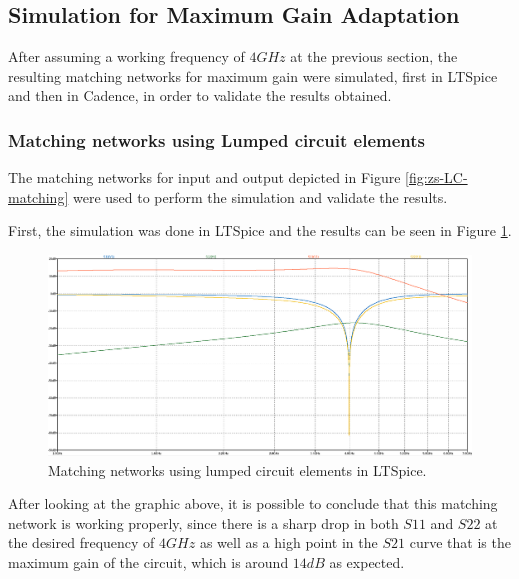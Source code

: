 \subsection{Simulation for Maximum Gain Adaptation}

After assuming a working frequency of $4 GHz$ at the previous section, the resulting matching networks for maximum gain were simulated, first in LTSpice and then in Cadence, in order to validate the results obtained.

\subsubsection{Matching networks using Lumped circuit elements}

The matching networks for input and output depicted in Figure \ref{fig:zs-LC-matching} were used to perform the simulation and validate the results.

First, the simulation was done in LTSpice and the results can be seen in Figure \ref{fig:SIMLCMatchingCircuit}.
\begin{figure}[H]
    \centering
    \includegraphics[width=1\textwidth]{Images/LT-LC-gain.png}
    \caption{Matching networks using lumped circuit elements in LTSpice.}
    \label{fig:SIMLCMatchingCircuit}
\end{figure}

After looking at the graphic above, it is possible to conclude that this matching network is working properly, since there is a sharp drop in both $S11$ and $S22$ at the desired frequency of $4GHz$ as well as a high point in the $S21$ curve that is the maximum gain of the circuit, which is around $14 dB$ as expected.

